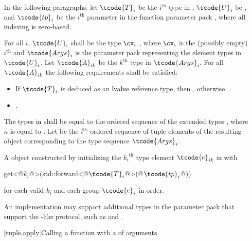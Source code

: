 \begin{itemdescr}
\pnum
In the following paragraphs, let $\tcode{T}_i$ be the $i^\text{th}$ type in ,
$\tcode{U}_i$ be , and $\tcode{tp}_i$ be the $i^\text{th}$
parameter in the function parameter pack , where all indexing is
zero-based.

\pnum
\requires For all $i$, $\tcode{U}_i$ shall be the type
$\cv_i$ , where $\cv_i$ is the (possibly empty) $i^\text{th}$
 and $\tcode{Args}_i$ is the parameter pack representing the element
types in $\tcode{U}_i$. Let $\tcode{A}_{ik}$ be the ${k}^\text{th}$ type in $\tcode{Args}_i$. For all
$\tcode{A}_{ik}$ the following requirements shall be satisfied:
\begin{itemize}
\item If $\tcode{T}_i$ is deduced as an lvalue reference type, then
      , otherwise
\item {}.
\end{itemize}

\pnum
\remarks The types in  shall be equal to the ordered
sequence of the extended types
,
where $n$ is
equal to . Let  be the $i^\text{th}$
ordered sequence of tuple elements of the resulting  object
corresponding to the type sequence $\tcode{Args}_i$.

\pnum
\returns A  object constructed by initializing the ${k_i}^\text{th}$
type element $\tcode{e}_{ik}$ in  with
\begin{codeblock}
get<@$k_i$@>(std::forward<@$\tcode{T}_i$@>(@$\tcode{tp}_i$@))
\end{codeblock}
for each valid $k_i$ and each group $\tcode{e}_i$ in order.

\pnum
\begin{note}
An implementation may support additional types in the parameter
pack  that support the -like protocol, such as
 and .
\end{note}
\end{itemdescr}

[tuple.apply]{Calling a function with a  of arguments}


